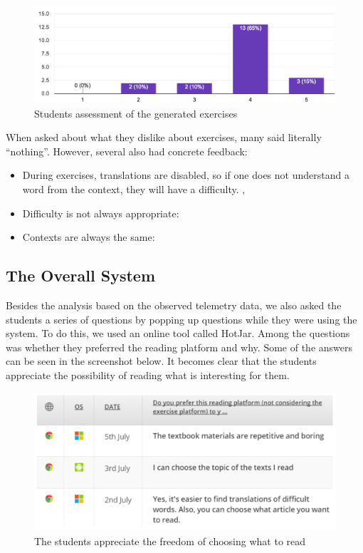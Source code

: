  \begin{figure}[h!]
    \centering
      \includegraphics[width=0.7\columnwidth]{figures/opinions/exercises_rating}
      \caption{Students assessment  of the generated exercises}
      \label{fig:ex_rating}
    \end{figure}

When asked about what they dislike about exercises, many said literally ``nothing''. However, several also had concrete feedback: 
\begin{itemize}
	\item During exercises, translations are disabled, so if one does not understand a word from the context, they will have a difficulty.
		,
	\item Difficulty is not always appropriate: 
	\item Contexts are always the same: 
\end{itemize}



\subsection{The Overall System}
Besides the analysis  based on the observed telemetry data, we also asked the students a series of questions by popping up questions while they were using the system. To do this, we used an online tool called HotJar. Among the questions was whether they preferred the reading platform and why. Some of the answers can be seen in the screenshot below. It becomes clear that the students appreciate the possibility of reading what is interesting for them.

    \begin{figure}[h!]
    \centering
      \includegraphics[width=0.7\columnwidth]{figures/opinion_on_reading_platform}
      \caption{The students appreciate the freedom of choosing what to read}
    \end{figure}


